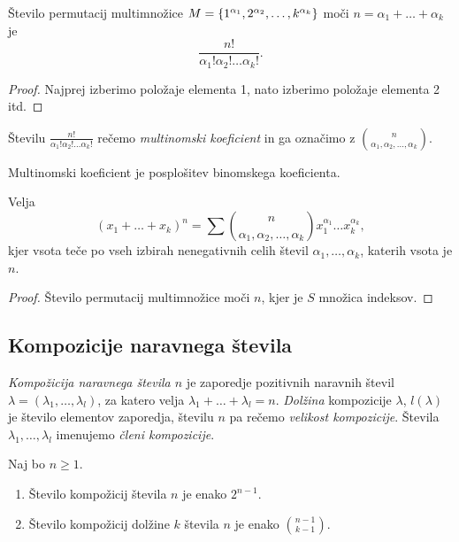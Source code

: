 \begin{trditev}
    Število permutacij multimnožice $M=\left\{1^{\alpha_1}, 2^{\alpha_2}, \ldots, k^{\alpha_k}\right\}$ moči $n = \alpha_1 + \ldots + \alpha_k$ je 
    $$\frac{n!}{\alpha_1!\alpha_2!\ldots\alpha_k!}.$$
\end{trditev}

\begin{proof}
    Najprej izberimo položaje elementa 1, nato izberimo položaje elementa 2 itd.
\end{proof}

\begin{definicija}
    Številu $\frac{n!}{\alpha_1! \alpha_2! \ldots \alpha_k!}$ rečemo \emph{multinomski koeficient} in ga označimo z $\binom{n}{\alpha_1, \alpha_2, \ldots, \alpha_k}$.
\end{definicija}

\begin{opomba}
    Multinomski koeficient je posplošitev binomskega koeficienta.
\end{opomba}

\begin{trditev}
    Velja 
    $$(x_1 + \ldots + x_k)^n = \sum \binom{n}{\alpha_1, \alpha_2, \ldots, \alpha_k}x_1^{\alpha_1} \ldots x_k^{\alpha_k},$$
    kjer vsota teče po vseh izbirah nenegativnih celih števil $\alpha_1, \ldots, \alpha_k$, katerih vsota je $n$.
\end{trditev}

\begin{proof}
    Število permutacij multimnožice moči $n$, kjer je $S$ množica indeksov.
\end{proof}

\subsection{Kompozicije naravnega števila}
\begin{definicija}
    \emph{Kompožicija naravnega števila $n$} je zaporedje pozitivnih naravnih števil $\lambda = (\lambda_1, \ldots, \lambda_l)$, za katero velja $\lambda_1 + \ldots + \lambda_l = n$. \emph{Dolžina} kompozicije $\lambda$, $l(\lambda)$ je število elementov zaporedja, številu $n$ pa rečemo \emph{velikost kompozicije}. Števila $\lambda_1, \ldots, \lambda_l$ imenujemo \emph{členi kompozicije}.
\end{definicija}

\begin{trditev}
    Naj bo $n \geq 1$.
    \begin{enumerate}
        \item Število kompožicij števila $n$ je enako $2^{n-1}$.
        \item Število kompožicij dolžine $k$ števila $n$ je enako $\binom{n-1}{k-1}$.
    \end{enumerate}
\end{trditev}

